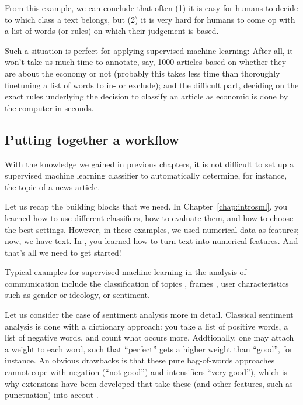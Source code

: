 From this example, we can conclude that often (1) it is easy for
humans to decide to which class a text belongs, but (2) it is very
hard for humans to come op with a list of words (or rules) on which
their judgement is based.

Such a situation is perfect for applying supervised machine
learning: After all, it won't take us much time to annotate, say, 1000
articles based on whether they are about the economy or not (probably
this takes less time than thoroughly finetuning a list of words to in-
or exclude); and the difficult part, deciding on the exact rules
underlying the decision to classify an article as economic is done by
the computer in seconds.


\subsection{Putting together a workflow}
\label{sec:workflow}

With the knowledge we gained in previous chapters, it is not difficult
to set up a supervised machine learning classifier to automatically
determine, for instance, the topic of a news article.

Let us recap the building blocks that we need. In
Chapter~\ref{chap:introsml}, you learned how to use different
classifiers, how to evaluate them, and how to choose the best
settings. However, in these examples, we used numerical data as
features; now, we have text.  In ,
you learned how to turn text into numerical
features. And that's all we need to get started!

Typical examples for supervised machine learning in the analysis of
communication include the classification of topics
\citep[e.g.,][]{Scharkow2011}, frames \citep[e.g.,][]{Burscher2014},
user characteristics such as gender or ideology,
or sentiment.

Let us consider the case of sentiment analysis more in
detail. Classical sentiment analysis is done with a dictionary
approach: you take a list of positive words, a list of negative words,
and count what occurs more. Addtionally, one may attach a weight to
each word, such that ``perfect'' gets a higher weight than ``good'',
for instance.  An obvious drawbacks is that these pure
bag-of-words approaches cannot cope with negation (``not good'') and
intensifiers ``very good''), which is why extensions have been
developed that take these (and other features, such as punctuation)
into accout \citep{Thelwall2012,Hutto2014,DeSmedt2012}.

